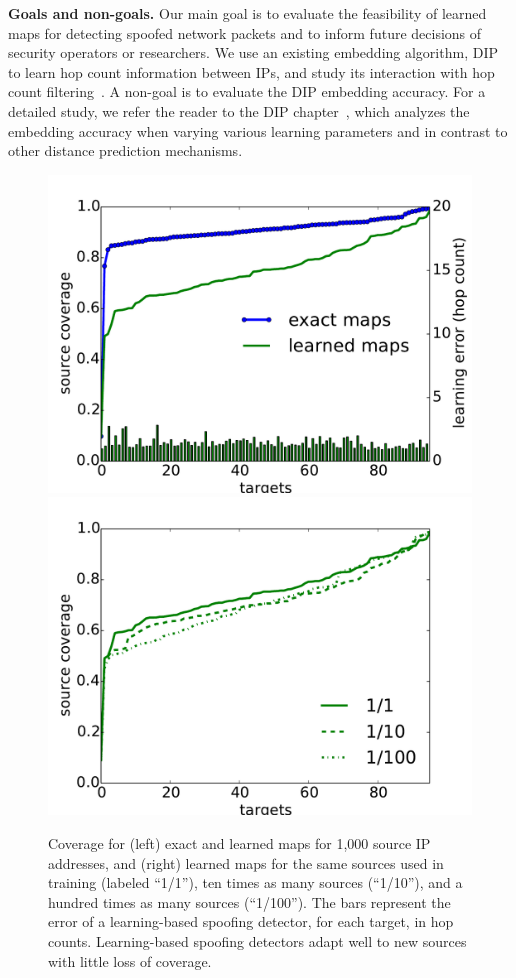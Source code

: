 {\bf Goals and non-goals.} Our main goal is to evaluate the feasibility of learned maps for detecting spoofed network packets and to inform future decisions of security operators or researchers. We use an existing embedding algorithm, DIP~\citep{dip} to learn hop count information between IPs, and study its interaction with hop count filtering~\citep{hcf}. A non-goal is to evaluate the DIP embedding accuracy. For a detailed study, we refer the reader to the DIP chapter~\citep{dip}, which analyzes the embedding accuracy when varying various learning parameters and in contrast to other distance prediction mechanisms.
\begin{figure}[t]
	\centering
	\includegraphics[width=.49\linewidth]{Graph/spoof/upperbound-upperbound-caida-jun2015-source-to-monitor-ttls-2000files-sample1000.pdf}
	\includegraphics[width=.49\linewidth]{Graph/spoof/coverage.pdf}
	\caption{Coverage for (left) exact and learned maps for 1,000 source IP addresses, and (right) learned maps for the same sources used in training (labeled ``1/1''), ten times as many sources (``1/10''), and a hundred times as many sources (``1/100''). The bars represent the error of a learning-based spoofing detector, for each target, in hop counts. Learning-based spoofing detectors adapt well to new sources with little loss of coverage.}
	\label{fig:upperbound}
	\vspace{0.5cm}
\end{figure}

